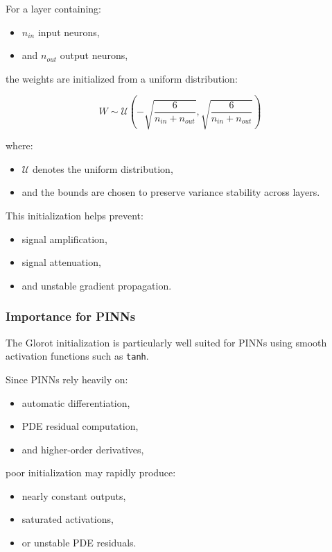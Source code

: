 For a layer containing:
\begin{itemize}
    \item $n_{in}$ input neurons,
    \item and $n_{out}$ output neurons,
\end{itemize}

the weights are initialized from a uniform distribution:

\begin{equation}
W
\sim
\mathcal{U}
\left(
-\sqrt{\frac{6}{n_{in}+n_{out}}},
\sqrt{\frac{6}{n_{in}+n_{out}}}
\right)
\end{equation}

where:
\begin{itemize}
    \item $\mathcal{U}$ denotes the uniform distribution,
    \item and the bounds are chosen to preserve variance stability across layers.
\end{itemize}

This initialization helps prevent:
\begin{itemize}
    \item signal amplification,
    \item signal attenuation,
    \item and unstable gradient propagation.
\end{itemize}

\subsubsection{Importance for PINNs}

The Glorot initialization is particularly well suited for PINNs using smooth activation functions such as \texttt{tanh}.

Since PINNs rely heavily on:
\begin{itemize}
    \item automatic differentiation,
    \item PDE residual computation,
    \item and higher-order derivatives,
\end{itemize}

poor initialization may rapidly produce:
\begin{itemize}
    \item nearly constant outputs,
    \item saturated activations,
    \item or unstable PDE residuals.
\end{itemize}

